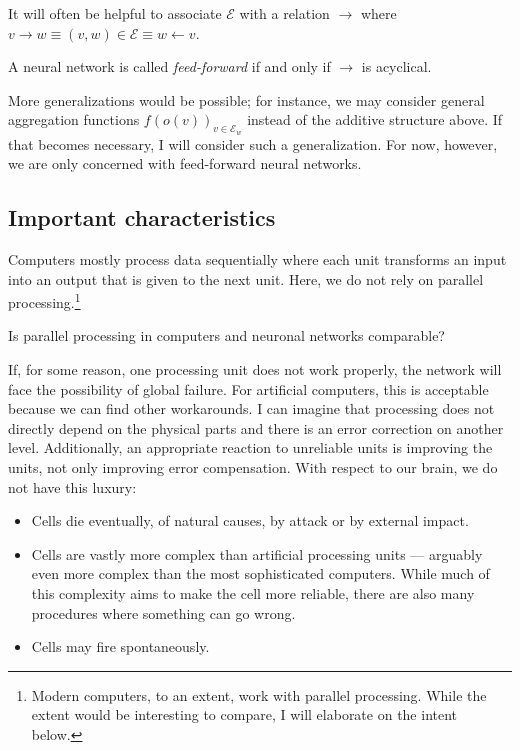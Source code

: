 \documentclass[a4paper,11pt]{article}
\begin{document}
It will often be helpful to associate $\mathcal{E}$ with a relation $\to$ where $v\to w\equiv(v,w)\in\mathcal{E}\equiv w\leftarrow v$.
\begin{Def}
A neural network is called \emph{feed-forward} if and only if $\to$ is acyclical.
\end{Def}
More generalizations would be possible; for instance, we may consider general aggregation functions $f\left(o(v)\right)_{v\in\mathcal{E}_w}$ instead of the additive structure above. If that becomes necessary, I will consider such a generalization. For now, however, we are only concerned with feed-forward neural networks.
\subsection{Important characteristics}
Computers mostly process data sequentially where each unit transforms an input into an output that is given to the next unit. Here, we do not rely on parallel processing.\footnote{
Modern computers, to an extent, work with parallel processing. While the extent would be interesting to compare, I will elaborate on the intent below.}
\begin{OP}
Is parallel processing in computers and neuronal networks comparable?
\end{OP}
If, for some reason, one processing unit does not work properly, the network will face the possibility of global failure. For artificial computers, this is acceptable because we can find other workarounds. I can imagine that processing does not directly depend on the physical parts and there is an error correction on another level. Additionally, an appropriate reaction to unreliable units is improving the units, not only improving error compensation. With respect to our brain, we do not have this luxury:
\begin{itemize}
\item
Cells die eventually, of natural causes, by attack or by external impact.
\item
Cells are vastly more complex than artificial processing units --- arguably even more complex than the most sophisticated computers. While much of this complexity aims to make the cell more reliable, there are also many procedures where something can go wrong.
\item
Cells may fire spontaneously.
\end{itemize}
\end{document}
